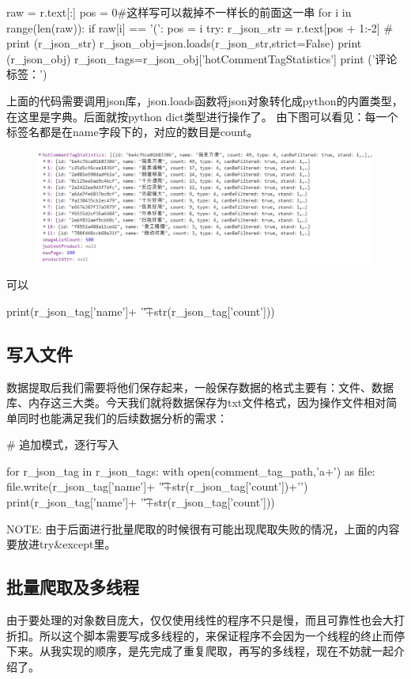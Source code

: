 \begin{python}
raw = r.text[:]
pos = 0#这样写可以裁掉不一样长的前面这一串
for i in range(len(raw)):
    if raw[i] == '(':
        pos = i
try:
    r_json_str = r.text[pos + 1:-2]
    # print (r_json_str)
    r_json_obj=json.loads(r_json_str,strict=False)
    print (r_json_obj)
    r_json_tags=r_json_obj['hotCommentTagStatistics']
    print ('评论标签：')
\end{python}
上面的代码需要调用json库，json.loads函数将json对象转化成python的内置类型，在这里是字典。后面就按python dict类型进行操作了。
由下图可以看见：每一个标签名都是在name字段下的，对应的数目是count。
\begin{figure}[htbp]
\centering
\includegraphics[width=13.5cm]{TIM图片20200111154351.png}
\end{figure}
可以
\begin{python}
print(r_json_tag['name']+
                      '\t'+str(r_json_tag['count']))
\end{python}
\subsection{写入文件}
数据提取后我们需要将他们保存起来，一般保存数据的格式主要有：文件、数据库、内存这三大类。今天我们就将数据保存为txt文件格式，因为操作文件相对简单同时也能满足我们的后续数据分析的需求：
\begin{python}
# 追加模式，逐行写入

        for r_json_tag in r_json_tags:
            with open(comment_tag_path,'a+') as file:
                file.write(r_json_tag['name']+
                           '\t'+str(r_json_tag['count'])+'\n')
                print(r_json_tag['name']+
                      '\t'+str(r_json_tag['count']))
\end{python}
NOTE: 由于后面进行批量爬取的时候很有可能出现爬取失败的情况，上面的内容要放进try\&except里。

\subsection{批量爬取及多线程}
由于要处理的对象数目庞大，仅仅使用线性的程序不只是慢，而且可靠性也会大打折扣。所以这个脚本需要写成多线程的，来保证程序不会因为一个线程的终止而停下来。从我实现的顺序，是先完成了重复爬取，再写的多线程，现在不妨就一起介绍了。

